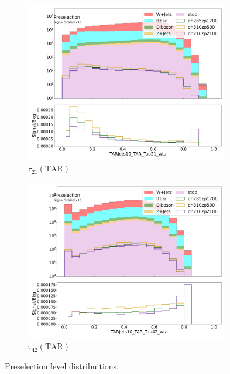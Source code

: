 \begin{figure}[htbp]
\begin{subfigure}{0.49\textwidth}
      \includegraphics[width = 0.98\textwidth]{Figures/appendix/Preselection/TARJets10_TAR_Tau21_wta.png}
      \caption{$\tau_{21}(\text{TAR})$}
      \end{subfigure}
      \begin{subfigure}{0.49\textwidth}
      \includegraphics[width = 0.98\textwidth]{Figures/appendix/Preselection/TARJets10_TAR_Tau42_wta.png}
      \caption{$\tau_{42}(\text{TAR})$}
      \end{subfigure}

      \caption{Preselection level distribuitions.}
      \label{fig:Presel2}
    \end{figure}

